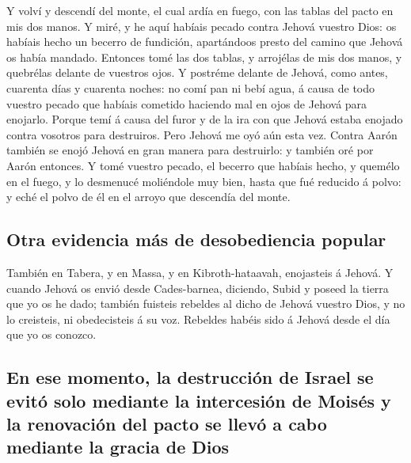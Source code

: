  Y volví y descendí del monte, el cual ardía en fuego,
con las tablas del pacto en mis dos manos.  Y miré, y he
aquí habíais pecado contra Jehová vuestro Dios: os habíais hecho un
becerro de fundición, apartándoos presto del camino que Jehová os había
mandado.  Entonces tomé las dos tablas, y arrojélas de
mis dos manos, y quebrélas delante de vuestros ojos.  Y
postréme delante de Jehová, como antes, cuarenta días y cuarenta noches:
no comí pan ni bebí agua, á causa de todo vuestro pecado que habíais
cometido haciendo mal en ojos de Jehová para enojarlo. 
Porque temí á causa del furor y de la ira con que Jehová estaba enojado
contra vosotros para destruiros. Pero Jehová me oyó aún esta vez.
 Contra Aarón también se enojó Jehová en gran manera para
destruirlo: y también oré por Aarón entonces.  Y tomé
vuestro pecado, el becerro que habíais hecho, y quemélo en el fuego, y
lo desmenucé moliéndole muy bien, hasta que fué reducido á polvo: y eché
el polvo de él en el arroyo que descendía del monte.

\hypertarget{otra-evidencia-muxe1s-de-desobediencia-popular}{%
\subsection{Otra evidencia más de desobediencia
popular}\label{otra-evidencia-muxe1s-de-desobediencia-popular}}

 También en Tabera, y en Massa, y en Kibroth-hataavah,
enojasteis á Jehová.  Y cuando Jehová os envió desde
Cades-barnea, diciendo, Subid y poseed la tierra que yo os he dado;
también fuisteis rebeldes al dicho de Jehová vuestro Dios, y no lo
creisteis, ni obedecisteis á su voz.  Rebeldes habéis
sido á Jehová desde el día que yo os conozco.

\hypertarget{en-ese-momento-la-destrucciuxf3n-de-israel-se-evituxf3-solo-mediante-la-intercesiuxf3n-de-moisuxe9s-y-la-renovaciuxf3n-del-pacto-se-llevuxf3-a-cabo-mediante-la-gracia-de-dios}{%
\subsection{En ese momento, la destrucción de Israel se evitó solo
mediante la intercesión de Moisés y la renovación del pacto se llevó a
cabo mediante la gracia de
Dios}\label{en-ese-momento-la-destrucciuxf3n-de-israel-se-evituxf3-solo-mediante-la-intercesiuxf3n-de-moisuxe9s-y-la-renovaciuxf3n-del-pacto-se-llevuxf3-a-cabo-mediante-la-gracia-de-dios}}


